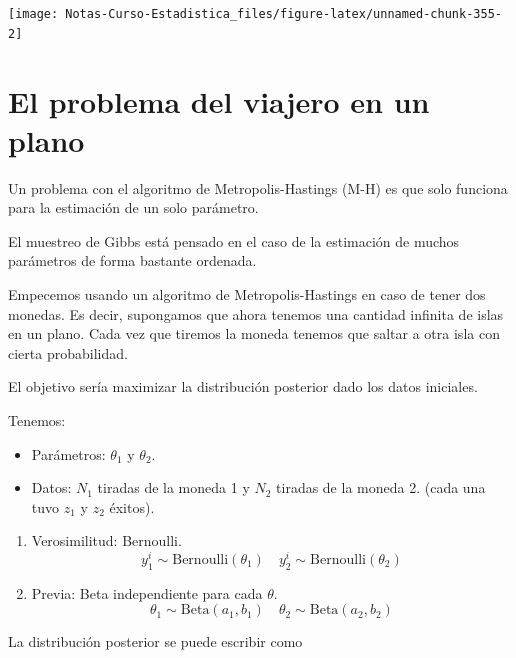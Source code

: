 \documentclass[
  12pt,
]{book}
\providecommand{\tightlist}{%
  \setlength{\itemsep}{0pt}\setlength{\parskip}{0pt}}
\theoremstyle{definition}
\theoremstyle{definition}
\theoremstyle{definition}
\theoremstyle{definition}
\theoremstyle{remark}
\begin{document}
\begin{center}\texttt{[image: Notas-Curso-Estadistica\_files/figure-latex/unnamed-chunk-355-2]} \end{center}

\hypertarget{el-problema-del-viajero-en-un-plano}{%
\section{El problema del viajero en un plano}\label{el-problema-del-viajero-en-un-plano}}

Un problema con el algoritmo de Metropolis-Hastings (M-H) es que solo funciona para la estimación de un solo parámetro.

El muestreo de Gibbs está pensado en el caso de la estimación de muchos parámetros de forma bastante ordenada.

Empecemos usando un algoritmo de Metropolis-Hastings en caso de tener dos monedas. Es decir, supongamos que ahora tenemos una cantidad infinita de islas en un plano. Cada vez que tiremos la moneda tenemos que saltar a otra isla con cierta probabilidad.

El objetivo sería maximizar la distribución posterior dado los datos iniciales.

Tenemos:

\begin{itemize}
\tightlist
\item
  Parámetros: \(\theta_{1}\) y \(\theta_{2}\).
\item
  Datos: \(N_{1}\) tiradas de la moneda 1 y \(N_{2}\) tiradas de la moneda 2. (cada una tuvo \(z_{1}\) y \(z_{2}\) éxitos).
\end{itemize}

\begin{enumerate}
\def\labelenumi{\arabic{enumi}.}
\setcounter{enumi}{2}
\item
  Verosimilitud: Bernoulli.
  \begin{equation*}
  y_{1}^{i}\sim \mathrm{Bernoulli}(\theta_{1}) 
  \quad 
  y_{2}^{i}\sim \mathrm{Bernoulli}(\theta_{2}) 
  \end{equation*}
\item
  Previa: Beta independiente para cada \(\theta\).
  \begin{equation*}
  \theta_{1}\sim \mathrm{Beta}(a_{1},b_{1}) 
  \quad 
  \theta_{2}\sim \mathrm{Beta}(a_{2},b_{2}) 
  \end{equation*}
\end{enumerate}

La distribución posterior se puede escribir como
\end{document}
